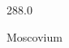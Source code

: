 \documentclass[12pt]{article}
\begin{document}
\hfill{}
\vfill
\begin{center}
  {\fontsize{50}{60}
  }

  288.0

Moscovium
\end{center}
\vfill
\end{document}
